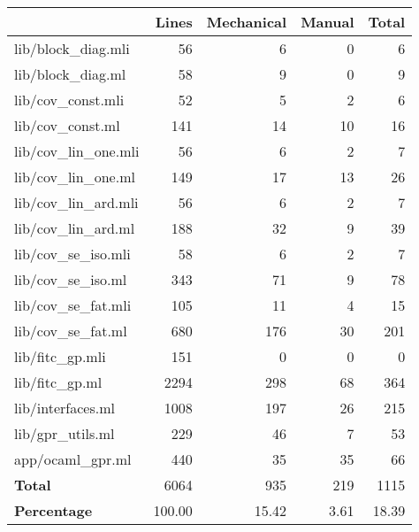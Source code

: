 \begin{tabular}{lrrrr}
  \hline
  & Lines & Mechanical & Manual & \textbf{Total} \\
  \hline
  lib/block\_diag.mli & 56 & 6 & 0 & 6 \\
  lib/block\_diag.ml & 58 & 9 & 0 & 9 \\
  lib/cov\_const.mli & 52 & 5 & 2 & 6 \\
  lib/cov\_const.ml & 141 & 14 & 10 & 16 \\
  lib/cov\_lin\_one.mli & 56 & 6 & 2 & 7 \\
  lib/cov\_lin\_one.ml & 149 & 17 & 13 & 26 \\
  lib/cov\_lin\_ard.mli & 56 & 6 & 2 & 7 \\
  lib/cov\_lin\_ard.ml & 188 & 32 & 9 & 39 \\
  lib/cov\_se\_iso.mli & 58 & 6 & 2 & 7 \\
  lib/cov\_se\_iso.ml & 343 & 71 & 9 & 78 \\
  lib/cov\_se\_fat.mli & 105 & 11 & 4 & 15 \\
  lib/cov\_se\_fat.ml & 680 & 176 & 30 & 201 \\
  lib/fitc\_gp.mli & 151 & 0 & 0 & 0 \\
  lib/fitc\_gp.ml & 2294 & 298 & 68 & 364 \\
  lib/interfaces.ml & 1008 & 197 & 26 & 215 \\
  lib/gpr\_utils.ml & 229 & 46 & 7 & 53 \\
  app/ocaml\_gpr.ml & 440 & 35 & 35 & 66 \\
  \hline
  \textbf{Total} & 6064 & 935 & 219 & 1115 \\
  \textbf{Percentage} & 100.00 & 15.42 & 3.61 & 18.39 \\
  \hline
  \end{tabular}
